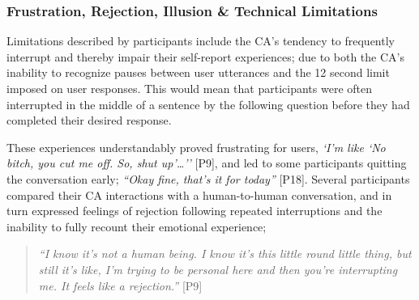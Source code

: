 
        \subsubsection{Frustration, Rejection, Illusion \& Technical Limitations}
        
            Limitations described by participants include the \ac{CA}'s tendency to frequently interrupt and thereby impair their self-report experiences; due to both the \ac{CA}'s inability to recognize pauses between user utterances and the 12 second limit imposed on user responses. This would mean that participants were often interrupted in the middle of a sentence by the following question before they had completed their desired response. 
            
            These experiences understandably proved frustrating for users, \textit{`I'm like `No bitch, you cut me off. So, shut up'\ldots''} [P9], and led to some participants quitting the conversation early; \textit{``Okay fine, that's it for today''} [P18]. Several participants compared their \ac{CA} interactions with a human-to-human conversation, and in turn expressed feelings of rejection following repeated interruptions and the inability to fully recount their emotional experience;
                
                \begin{quote}
                \vspace{2mm}
                    \textit{``I know it's not a human being. I know it's this little round little thing, but still it's like, I'm trying to be personal here and then you're interrupting me. It feels like a rejection.''} [P9]
                \vspace{2mm}
                \end{quote}
                
